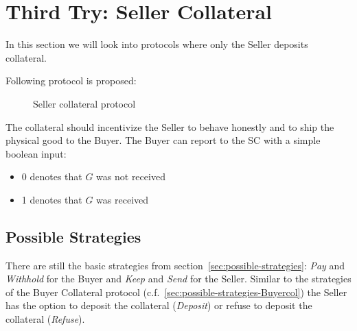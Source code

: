 \documentclass{cacthesis}
\begin{document}
\section{Third Try: Seller Collateral}
\label{sec:Seller-col}
In this section we will look into protocols where only the Seller deposits collateral.\newline

Following protocol is proposed:
\begin{figure}[htb!]
    \centering
    \caption{Seller collateral protocol}
    \label{pro:Seller-col}
\end{figure}

The collateral should incentivize the Seller to behave honestly and to ship the
physical good to the Buyer. The Buyer can report to the SC with a simple boolean input:
\begin{itemize}
    \item 0 denotes that $G$ was not received
    \item 1 denotes that $G$ was received
\end{itemize}
\subsection{Possible Strategies}
\label{sec:possible-strategies-Sellercol}
There are still the basic strategies from section~\ref{sec:possible-strategies}: \emph{Pay} and \emph{Withhold} for the Buyer and \emph{Keep} and \emph{Send} for the Seller. Similar to the strategies of the Buyer Collateral protocol (c.f.~\ref{sec:possible-strategies-Buyercol}) the Seller has the option to deposit the collateral (\emph{Deposit}) or refuse to deposit the collateral (\emph{Refuse}).\newline
\end{document}

